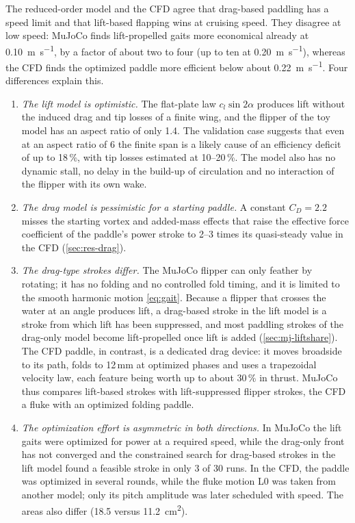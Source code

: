 The reduced-order model and the CFD agree that drag-based paddling has a speed limit and that lift-based flapping wins at cruising
speed. They disagree at low speed: MuJoCo finds lift-propelled gaits more economical already at
\SI{0.10}{\metre\per\second}, by a factor of about two to four (up to ten at \SI{0.20}{\metre\per\second}), whereas the CFD finds the optimized paddle more efficient below about
\SI{0.22}{\metre\per\second}. Four differences explain this.
\begin{enumerate}
  \item \emph{The lift model is optimistic.} The flat-plate law $c_l\sin2\alpha$ produces lift without the induced drag and
        tip losses of a finite wing, and the flipper of the toy model has an aspect ratio of only 1.4. The validation case suggests that even at an aspect ratio of 6 the finite span is a likely cause of an efficiency deficit of up to 18\,\%, with tip losses estimated at 10--20\,\%. The model also has no dynamic stall,
        no delay in the build-up of circulation and no interaction of the flipper with its own wake.
  \item \emph{The drag model is pessimistic for a starting paddle.} A constant $C_D=2.2$ misses the starting vortex and added-mass
        effects that raise the effective force coefficient of the paddle's power stroke to 2--3 times its quasi-steady value in
        the CFD (\cref{sec:res-drag}).
  \item \emph{The drag-type strokes differ.} The MuJoCo flipper can only feather by rotating; it has no folding and no controlled
        fold timing, and it is limited to the smooth harmonic motion \eqref{eq:gait}. Because a flipper that crosses the water at an
        angle produces lift, a drag-based stroke in the lift model is a stroke from which lift has been suppressed, and most
        paddling strokes of the drag-only model become lift-propelled once lift is added (\cref{sec:mj-liftshare}). The CFD
        paddle, in contrast, is a dedicated drag device: it moves broadside to its path, folds to 12\,mm at optimized phases and
        uses a trapezoidal velocity law, each feature being worth up to about 30\,\% in thrust. MuJoCo thus compares lift-based strokes with
        lift-suppressed flipper strokes, the CFD a fluke with an optimized folding paddle.
  \item \emph{The optimization effort is asymmetric in both directions.} In MuJoCo the lift gaits were optimized for power at a
        required speed, while the drag-only front has not converged and the constrained search for drag-based strokes in the
        lift model found a feasible stroke in only 3 of 30 runs. In the CFD, the paddle was optimized in several rounds,
        while the fluke motion L0 was taken from another model; only its pitch amplitude was later scheduled with speed. The
        areas also differ (\SI{18.5}{} versus \SI{11.2}{\square\centi\metre}).
\end{enumerate}
